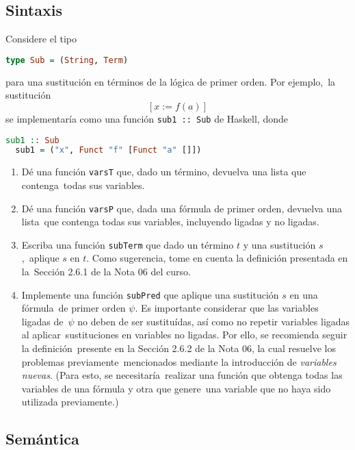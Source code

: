 \documentclass[paper=letter, fontsize=12pt]{scrartcl}
\begin{document}
\subsection{Sintaxis}

\noindent
Considere el tipo
\begin{lstlisting}[language=Haskell]
  type Sub = (String, Term)
\end{lstlisting}
para una sustitución en términos de la lógica de primer orden. Por ejemplo,\
la sustitución
\[[x := f(a)]\]
se implementaría como una función \verb+sub1 :: Sub+ de Haskell, donde
\begin{lstlisting}[language=Haskell]
  sub1 :: Sub
  sub1 = ("x", Funct "f" [Funct "a" []])
\end{lstlisting}

\begin{enumerate}
\item Dé una función \verb+varsT+ que, dado un término, devuelva una lista que contenga\
  todas sus variables.
\item Dé una función \verb+varsP+ que, dada una fórmula de primer orden, devuelva una lista\
  que contenga todas sus variables, incluyendo ligadas y no ligadas.
\item Escriba una función \verb+subTerm+ que dado un término $t$ y una sustitución $s$,\
  aplique $s$ en $t$. Como sugerencia, tome en cuenta la definición presentada en la\
  Sección 2.6.1 de la Nota 06 del curso.
\item Implemente una función \verb+subPred+ que aplique una sustitución $s$ en una fórmula\
  de primer orden $\psi$. Es importante considerar que las variables ligadas de\
  $\psi$ no deben de ser sustituídas, así como no repetir variables ligadas al aplicar\
  sustituciones en variables no ligadas. Por ello, se recomienda seguir la definición\
  presente en la Sección 2.6.2 de la Nota 06, la cual resuelve los problemas previamente\
  mencionados mediante la introducción de \emph{variables nuevas}. (Para esto, se necesitaría\
  realizar una función que obtenga todas las variables de una fórmula y otra que genere\
  una variable que no haya sido utilizada previamente.)
\end{enumerate}

\subsection{Semántica}
\end{document}
